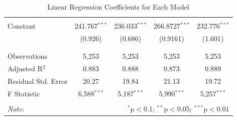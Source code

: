 \documentclass[11pt]{article}
\begin{document}
\begin{table}[!htbp]
\begin{tabular}{@{\extracolsep{5pt}}lcccc}
& & & & \\ 
Constant & 241.767$^{***}$ & 236.033$^{***}$& 266.8727$^{***}$ & 232.776$^{***}$\\ 
& (0.926) & (0.686) & (0.9161) & (1.601) \\ 
& & & & \\ 
\hline \\[-1.8ex] 
Observations & 5,253 & 5,253 & 5,253 & 5,253 \\ 
Adjusted R$^{2}$ & 0.883 & 0.888 & 0.873 & 0.889 \\ 
Residual Std. Error & 20.27 & 19.84 & 21.13 & 19.72\\ 
F Statistic & 6,588$^{***}$ & 5,187$^{***}$ & 5,990$^{***}$ & 5,257$^{***}$ \\ 
\hline 
\hline \\[-1.8ex] 
\textit{Note:}  & \multicolumn{4}{r}{$^{*}$p$<$0.1; $^{**}$p$<$0.05; $^{***}$p$<$0.01} \\ 
\end{tabular} 
\caption{Linear Regression Coefficients for Each Model} 
\end{table} 
\end{document}
